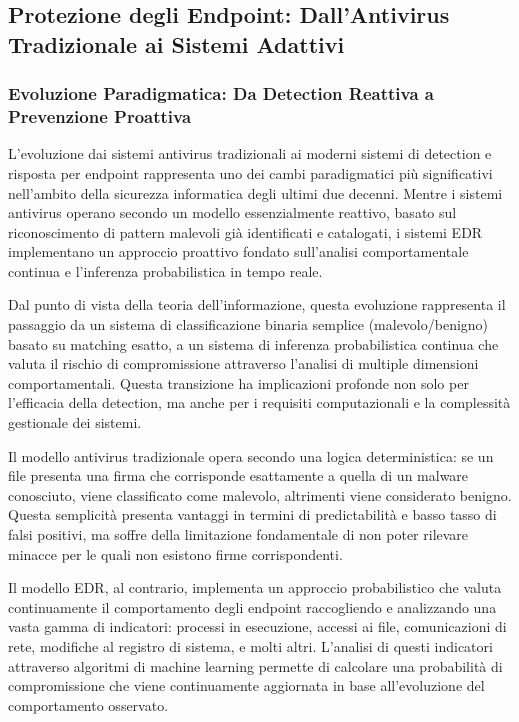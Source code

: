 {\subsection{Protezione degli Endpoint: Dall'Antivirus Tradizionale ai Sistemi Adattivi}

\subsubsection{Evoluzione Paradigmatica: Da Detection Reattiva a Prevenzione Proattiva}

L'evoluzione dai sistemi antivirus tradizionali ai moderni sistemi di detection e risposta per endpoint rappresenta uno dei cambi paradigmatici più significativi nell'ambito della sicurezza informatica degli ultimi due decenni. Mentre i sistemi antivirus operano secondo un modello essenzialmente reattivo, basato sul riconoscimento di pattern malevoli già identificati e catalogati, i sistemi EDR implementano un approccio proattivo fondato sull'analisi comportamentale continua e l'inferenza probabilistica in tempo reale.

Dal punto di vista della teoria dell'informazione, questa evoluzione rappresenta il passaggio da un sistema di classificazione binaria semplice (malevolo/benigno) basato su matching esatto, a un sistema di inferenza probabilistica continua che valuta il rischio di compromissione attraverso l'analisi di multiple dimensioni comportamentali. Questa transizione ha implicazioni profonde non solo per l'efficacia della detection, ma anche per i requisiti computazionali e la complessità gestionale dei sistemi.

Il modello antivirus tradizionale opera secondo una logica deterministica: se un file presenta una firma che corrisponde esattamente a quella di un malware conosciuto, viene classificato come malevolo, altrimenti viene considerato benigno. Questa semplicità presenta vantaggi in termini di predictabilità e basso tasso di falsi positivi, ma soffre della limitazione fondamentale di non poter rilevare minacce per le quali non esistono firme corrispondenti.

Il modello EDR, al contrario, implementa un approccio probabilistico che valuta continuamente il comportamento degli endpoint raccogliendo e analizzando una vasta gamma di indicatori: processi in esecuzione, accessi ai file, comunicazioni di rete, modifiche al registro di sistema, e molti altri. L'analisi di questi indicatori attraverso algoritmi di machine learning permette di calcolare una probabilità di compromissione che viene continuamente aggiornata in base all'evoluzione del comportamento osservato.

}

